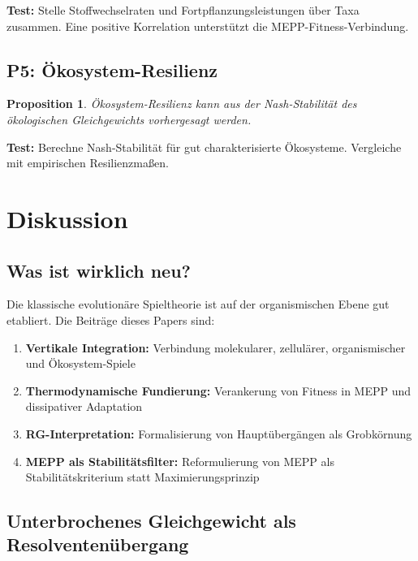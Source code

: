 \documentclass[12pt,a4paper]{article}
\newtheorem{proposition}{Proposition}
\theoremstyle{remark}
\begin{document}
\textbf{Test:} Stelle Stoffwechselraten und Fortpflanzungsleistungen \"uber Taxa zusammen. Eine positive Korrelation unterst\"utzt die MEPP-Fitness-Verbindung.

\subsection{P5: \"Okosystem-Resilienz}

\begin{proposition}
\"Okosystem-Resilienz kann aus der Nash-Stabilit\"at des \"okologischen Gleichgewichts vorhergesagt werden.
\end{proposition}

\textbf{Test:} Berechne Nash-Stabilit\"at f\"ur gut charakterisierte \"Okosysteme. Vergleiche mit empirischen Resilienzma\ss{}en.

\section{Diskussion}
\label{sec:discussion}

\subsection{Was ist wirklich neu?}

Die klassische evolution\"are Spieltheorie ist auf der organismischen Ebene gut etabliert. Die Beitr\"age dieses Papers sind:
\begin{enumerate}
    \item \textbf{Vertikale Integration:} Verbindung molekularer, zellul\"arer, organismischer und \"Okosystem-Spiele
    \item \textbf{Thermodynamische Fundierung:} Verankerung von Fitness in MEPP und dissipativer Adaptation
    \item \textbf{RG-Interpretation:} Formalisierung von Haupt\"uberg\"angen als Grobk\"ornung
    \item \textbf{MEPP als Stabilit\"atsfilter:} Reformulierung von MEPP als Stabilit\"atskriterium statt Maximierungsprinzip
\end{enumerate}

\subsection{Unterbrochenes Gleichgewicht als Resolventen\"ubergang}
\end{document}
